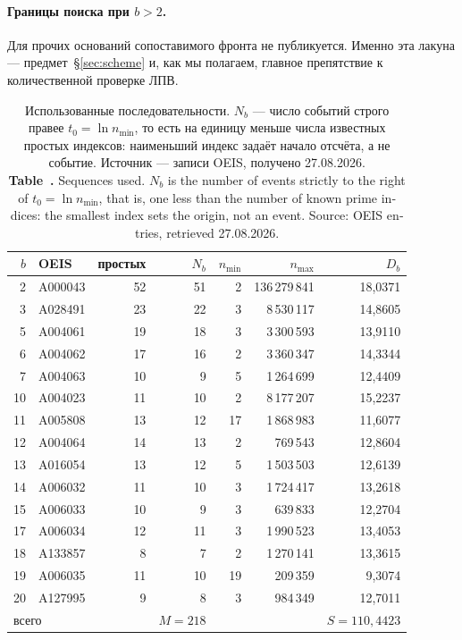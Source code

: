 \documentclass[11pt,a4paper]{article}
\newcommand{\encaptab}[1]{\\[3pt]\foreignlanguage{english}{%
  \textbf{Table~\thetable.} #1}}
\theoremstyle{plain}
\theoremstyle{remark}
\begin{document}
\paragraph{Границы поиска при $b>2$.} Для прочих оснований сопоставимого фронта не
публикуется. Именно эта лакуна --- предмет~\S\ref{sec:scheme} и, как мы полагаем,
главное препятствие к количественной проверке ЛПВ.

\begin{table}[t]
\centering
\caption{Использованные последовательности. $N_b$ --- число событий строго правее
$t_0=\ln n_{\min}$, то есть на единицу меньше числа известных простых индексов:
наименьший индекс задаёт начало отсчёта, а не событие. Источник --- записи OEIS,
получено 27.08.2026.
\encaptab{Sequences used. $N_b$ is the number of events strictly to the right of
$t_0=\ln n_{\min}$, that is, one less than the number of known prime indices: the
smallest index sets the origin, not an event. Source: OEIS entries, retrieved
27.08.2026.}}
\label{tab:data}
\small
\begin{tabular}{rlrrrrr}
\toprule
$b$ & OEIS & простых & $N_b$ & $n_{\min}$ & $n_{\max}$ & $D_b$\\
\midrule
2 & A000043 & 52 & 51 & 2 & 136\,279\,841 & 18{,}0371\\
3 & A028491 & 23 & 22 & 3 & 8\,530\,117 & 14{,}8605\\
5 & A004061 & 19 & 18 & 3 & 3\,300\,593 & 13{,}9110\\
6 & A004062 & 17 & 16 & 2 & 3\,360\,347 & 14{,}3344\\
7 & A004063 & 10 & 9 & 5 & 1\,264\,699 & 12{,}4409\\
10 & A004023 & 11 & 10 & 2 & 8\,177\,207 & 15{,}2237\\
11 & A005808 & 13 & 12 & 17 & 1\,868\,983 & 11{,}6077\\
12 & A004064 & 14 & 13 & 2 & 769\,543 & 12{,}8604\\
13 & A016054 & 13 & 12 & 5 & 1\,503\,503 & 12{,}6139\\
14 & A006032 & 11 & 10 & 3 & 1\,724\,417 & 13{,}2618\\
15 & A006033 & 10 & 9 & 3 & 639\,833 & 12{,}2704\\
17 & A006034 & 12 & 11 & 3 & 1\,990\,523 & 13{,}4053\\
18 & A133857 & 8 & 7 & 2 & 1\,270\,141 & 13{,}3615\\
19 & A006035 & 11 & 10 & 19 & 209\,359 & 9{,}3074\\
20 & A127995 & 9 & 8 & 3 & 984\,349 & 12{,}7011\\
\midrule
\multicolumn{3}{l}{всего} & $M=218$ & & & $S=110{,}4423$\\
\bottomrule
\end{tabular}
\end{table}
\end{document}
